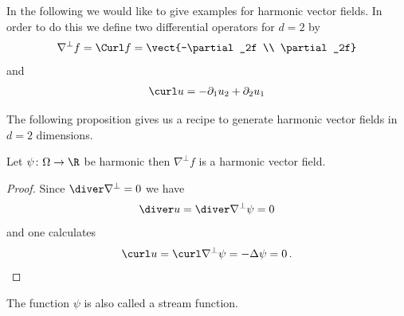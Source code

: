 In the following we would like to give examples for harmonic vector fields.
In order to do this we define two differential operators for $d=2$ by
\begin{align*}
  \nabla^\perp f=\Curl f=\vect{-\partial_2f \\ \partial_2f}
\end{align*}
and
\begin{align*}
  \curl u=-\partial_1u_2+\partial_2u_1
\end{align*}

The following proposition gives us a recipe to generate harmonic vector fields in $d=2$ dimensions.
\begin{proposition}
  Let $\psi\colon\Omega\to\R$ be harmonic then $\nabla^\perp f$ is a harmonic vector field.
\end{proposition} 
\begin{proof}
  Since $\diver \nabla^\perp=0$ we have
  \begin{align*}
    \diver u = \diver\nabla^\perp \psi=0
  \end{align*}
  and one calculates
  \begin{align*}
    \curl u = \curl\nabla^\perp \psi = -\Delta \psi = 0\,.
  \end{align*}
\end{proof}
The function $\psi$ is also called a stream function.

